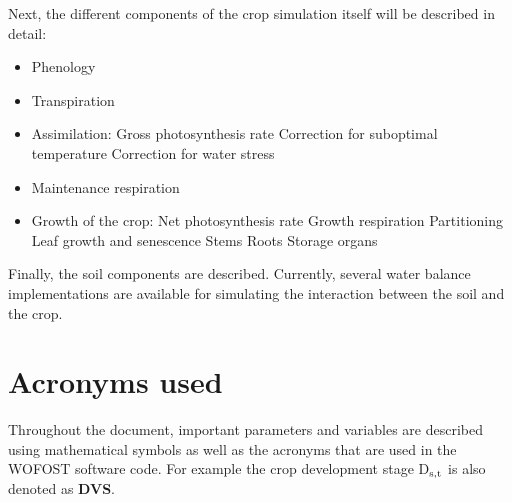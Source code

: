 Next, the different components of the crop simulation itself will be described in detail:
\begin{itemize}
	\item Phenology
	\item Transpiration
	\item Assimilation:
	\subitem Gross photosynthesis rate
	\subitem Correction for suboptimal temperature
	\subitem Correction for water stress
	\item Maintenance respiration
	\item Growth of the crop:
	\subitem Net photosynthesis rate
	\subitem Growth respiration
	\subitem Partitioning
	\subitem Leaf growth and senescence 
	\subitem Stems
	\subitem Roots
	\subitem Storage organs	
\end{itemize}

Finally, the soil components are described. Currently, several water balance implementations are
available for simulating the interaction between the soil and the crop.

\section{Acronyms used}

Throughout the document, important parameters and variables are described using mathematical symbols as well as
the acronyms that are used in the WOFOST software code. For example the crop development stage
D$_{{\rm s,t}}$ is also denoted as {\bf DVS}.

